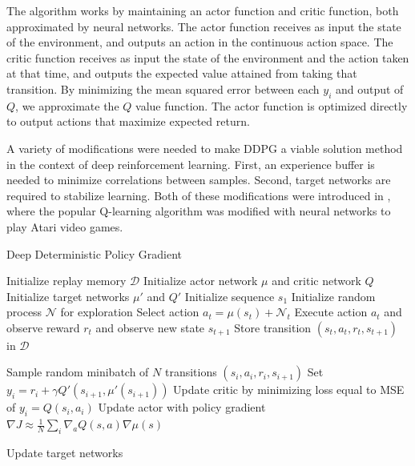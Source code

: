 \documentclass[10pt,twocolumn,letterpaper]{article}
\begin{document}
The algorithm works by maintaining an actor function and critic function, both approximated by neural networks.
The actor function receives as input the state of the environment, and outputs an action in the continuous action space.
The critic function receives as input the state of the environment and the action taken at that time, and outputs the expected value attained from taking that transition.
By minimizing the mean squared error between each $y_i$ and output of $Q$, we approximate the $Q$ value function.
The actor function is optimized directly to output actions that maximize expected return.

A variety of modifications were needed to make DDPG a viable solution method in the context of deep reinforcement learning.
First, an experience buffer is needed to minimize correlations between samples.
Second, target networks are required to stabilize learning.
Both of these modifications were introduced in \cite{dqn}, where the popular Q-learning algorithm \cite{sutton_barto_2018} was modified with neural networks to play Atari video games.


\begin{algorithm}
\caption{Deep Deterministic Policy Gradient}
\label{alg:ddpg}
\begin{algorithmic}[1]
\State Initialize replay memory $\mathcal{D}$
\State Initialize actor network $\mu$ and critic network $Q$
\State Initialize target networks $\mu'$ and $Q'$
    \State Initialize sequence $s_1$ 
    \State Initialize random process $\mathcal{N}$ for exploration
        \State Select action $a_t = \mu(s_t) + \mathcal{N}_t$
        \State Execute action $a_t$ and observe reward $r_t$ and observe new state $s_{t+1}$
        \State Store transition $(s_t, a_t, r_t, s_{t+1})$ in $\mathcal{D}$

        \State Sample random minibatch of $N$ transitions $(s_i, a_i, r_i, s_{i + 1})$
        \State Set $ \displaystyle  y_i = r_i + \gamma Q'(s_{i + 1}, \mu'(s_{i + 1}))$
        \State Update critic by minimizing loss equal to MSE of $y_i = Q(s_i, a_i)$
        \State Update actor with policy gradient $ \displaystyle \nabla J \approx \frac{1}{N} \sum_{i} \nabla_{a}Q(s, a) \nabla \mu(s) $

        \State Update target networks
    \EndFor
\EndFor
\end{algorithmic}
\end{algorithm}
\end{document}
